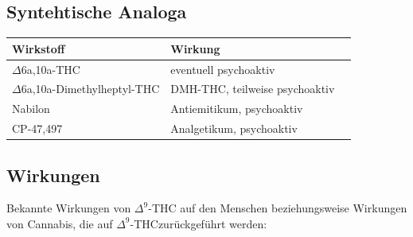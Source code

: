 \documentclass[openany]{scrbook}
\begin{document}
\subsection{Syntehtische Analoga}
	 \begin{tabular}[pos]{l|lr}
	 	\textbf{Wirkstoff}&\textbf{Wirkung}\\ \hline
	 	$\Delta$6a,10a-THC & eventuell psychoaktiv \\
	 	$\Delta$6a,10a-Dimethylheptyl-THC & DMH-THC, teilweise psychoaktiv\\
	 	Nabilon & Antiemitikum, psychoaktiv \\
	 	CP-47,497 & Analgetikum, psychoaktiv
	 \end{tabular}
	 
\subsection{Wirkungen}
	Bekannte Wirkungen von $\Delta^9$-THC auf den Menschen beziehungsweise Wirkungen von Cannabis, die auf $\Delta^9$-THCzurückgeführt werden: \\
	
\end{document}
